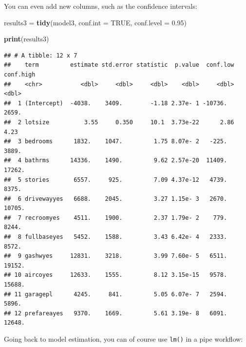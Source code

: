 \documentclass[]{gitbook}
\newenvironment{Shaded}{\begin{snugshade}}{\end{snugshade}}
\newcommand{\DataTypeTok}[1]{\textcolor[rgb]{0.13,0.29,0.53}{#1}}
\newcommand{\FloatTok}[1]{\textcolor[rgb]{0.00,0.00,0.81}{#1}}
\newcommand{\KeywordTok}[1]{\textcolor[rgb]{0.13,0.29,0.53}{\textbf{#1}}}
\newcommand{\NormalTok}[1]{#1}
\newcommand{\OperatorTok}[1]{\textcolor[rgb]{0.81,0.36,0.00}{\textbf{#1}}}
\newcommand{\OtherTok}[1]{\textcolor[rgb]{0.56,0.35,0.01}{#1}}
\newcommand{\StringTok}[1]{\textcolor[rgb]{0.31,0.60,0.02}{#1}}
\theoremstyle{definition}
\theoremstyle{definition}
\theoremstyle{definition}
\theoremstyle{remark}
\begin{document}
You can even add new columns, such as the confidence intervals:

\begin{Shaded}
\begin{Highlighting}[]
\NormalTok{results3 =}\StringTok{ }\KeywordTok{tidy}\NormalTok{(model3, }\DataTypeTok{conf.int =} \OtherTok{TRUE}\NormalTok{, }\DataTypeTok{conf.level =} \FloatTok{0.95}\NormalTok{)}

\KeywordTok{print}\NormalTok{(results3)}
\end{Highlighting}
\end{Shaded}

\begin{verbatim}
## # A tibble: 12 x 7
##    term         estimate std.error statistic  p.value  conf.low conf.high
##    <chr>           <dbl>     <dbl>     <dbl>    <dbl>     <dbl>     <dbl>
##  1 (Intercept)  -4038.    3409.        -1.18 2.37e- 1 -10736.     2659.  
##  2 lotsize          3.55     0.350     10.1  3.73e-22      2.86      4.23
##  3 bedrooms      1832.    1047.         1.75 8.07e- 2   -225.     3889.  
##  4 bathrms      14336.    1490.         9.62 2.57e-20  11409.    17262.  
##  5 stories       6557.     925.         7.09 4.37e-12   4739.     8375.  
##  6 drivewayyes   6688.    2045.         3.27 1.15e- 3   2670.    10705.  
##  7 recroomyes    4511.    1900.         2.37 1.79e- 2    779.     8244.  
##  8 fullbaseyes   5452.    1588.         3.43 6.42e- 4   2333.     8572.  
##  9 gashwyes     12831.    3218.         3.99 7.60e- 5   6511.    19152.  
## 10 aircoyes     12633.    1555.         8.12 3.15e-15   9578.    15688.  
## 11 garagepl      4245.     841.         5.05 6.07e- 7   2594.     5896.  
## 12 prefareayes   9370.    1669.         5.61 3.19e- 8   6091.    12648.
\end{verbatim}

Going back to model estimation, you can of course use \texttt{lm()} in a
pipe workflow:

\begin{Shaded}
\end{Shaded}
\end{document}

